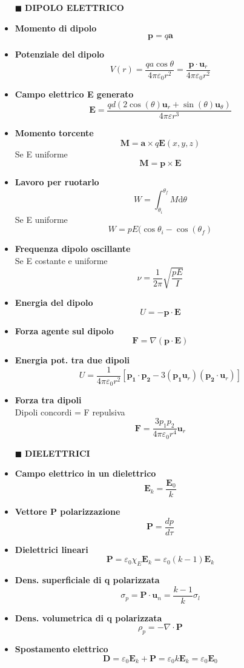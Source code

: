 \documentclass{book}
\newcommand{\g}{\textbf}
\newcommand{\h}{\mathbf}
\newcommand{\e}{\begin{equation}}
\newcommand{\ex}{\end{equation} }
\renewcommand{\it}{\item[$\cdot$]}
\begin{document}
\begin{multicols}{4}
\begin{itemize}
\hline
\item [$\blacksquare$] \g{DIPOLO ELETTRICO}
    \it \g{Momento di dipolo}
        \e{\h{p}=q \h{a}} \ex
    \it \g{Potenziale del dipolo}
        \e{V(r)=\frac{qa\cos{\theta}}{4\pi\varepsilon_0 r^2}=\frac{\h{p}\cdot\h{u}_r}{4\pi\varepsilon_0 r^2}} \ex
    \it \g{Campo elettrico \g{E} generato}
        \e{\mathbf{E}={\frac{q d\left(2\cos\left(\theta\right)\mathbf{u}_{r}+\sin\left(\theta\right)\mathbf{u}_{\theta}\right)}{4\pi\varepsilon r^{3}}}} \ex
    \it \g{Momento torcente}
        \e{\h{M}=\h{a}\times q\h{E}(x,y,z)} \ex
        Se E uniforme
        \e{\h{M}=\h{p}\times\h{E}} \ex
    \it \g{Lavoro per ruotarlo} 
        \e{W=\int_{\theta_{i}}^{\theta_{f}}M \mathrm{d}\theta} \ex
        Se E uniforme
        \e{W=p E(\cos\theta_{i}-\cos(\theta_{f})} \ex
    \it \g{Frequenza dipolo oscillante} \\
        Se E costante e uniforme
        \e{\nu=\frac{1}{2\pi}\sqrt{\frac{pE}{I}}} \ex
    \it \g{Energia del dipolo}
        \e{U=-\h{p}\cdot\h{E}} \ex
    \it \g{Forza agente sul dipolo}
        \e{\h{F}=\nabla(\h{p}\cdot\h{E})} \ex
    \it \g{Energia pot. tra due dipoli}
        \e{U=\frac{1}{4\pi\varepsilon_0r^2}[\h{p_1}\cdot\h{p_2}-3(\h{p_1}\h{u}_r)(\h{p_2}\cdot\h{u}_r)]}\ex
    \it \g{Forza tra dipoli}\\
        Dipoli concordi = F repulsiva
        \e{\h{F}=\frac{3p_1p_2}{4\pi\varepsilon_0r^4}\h{u}_r}\ex

\hline
\item [$\blacksquare$] \g{DIELETTRICI}
    \it \g{Campo elettrico in un dielettrico}
        \e{\h{E}_k=\frac{\h{E}_0}{k}} \ex
    \it \g{Vettore P polarizzazione}
        \e{\h{P}=\frac{dp}{d\tau}} \ex
    \it \g{Dielettrici lineari}
        \e{\h{P}=\varepsilon_0\chi_E \h{E}_k=\varepsilon_0(k-1)\h{E}_k} \ex
    \it \g{Dens. superficiale di q polarizzata}
        \e{\sigma_p=\h{P}\cdot\h{u}_n=\frac{k-1}{k}\sigma_l} \ex
    \it \g{Dens. volumetrica di q polarizzata}
        \e{\rho_p=-\nabla\cdot\h{P}} \ex
    \it \g{Spostamento elettrico}
        \e{\h{D}=\varepsilon_0 \h{E}_k+\h{P}=\varepsilon_0 k \h{E}_k=\varepsilon_0 \h{E}_0} \ex


\end{itemize}
\end{multicols}
\end{document}
